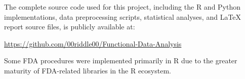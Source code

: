 \documentclass[twoside,11pt]{article}
\begin{document}
The complete source code used for this project, including the R and Python implementations, data
preprocessing scripts, statistical analyses, and LaTeX report source files, is publicly available
at:

\vspace{0.8\baselineskip}

\url{https://github.com/00riddle00/Functional-Data-Analysis}

\vspace{0.8\baselineskip}

Some FDA procedures were implemented primarily in R due to the greater maturity of FDA-related
libraries in the R ecosystem.

\end{document}
